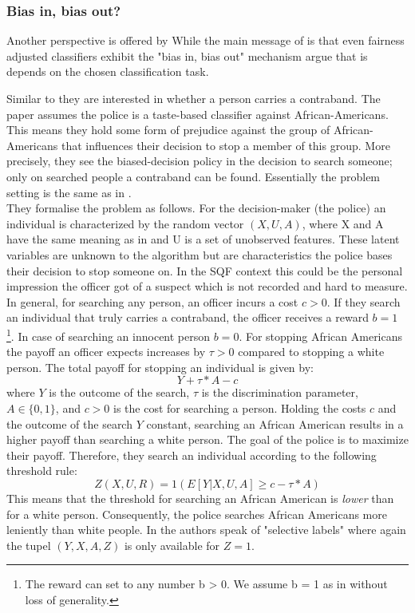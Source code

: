 \subsubsection*{Bias in, bias out?}

Another perspective is offered by \cite{RambachanBBOEFW}
While the main message of \cite{kallus2018} is that even fairness adjusted classifiers exhibit the "bias in, bias out" mechanism \cite{RambachanBBOEFW} argue that is depends on the chosen classification task.

Similar to \cite{kallus2018} they are interested in whether a person carries a contraband. The paper assumes the police is a taste-based classifier against African-Americans. This means they hold some form of prejudice against the group of African-Americans that influences their decision to stop a member of this group. More precisely, they see the biased-decision policy in the decision to search someone; only on searched people a contraband can be found. Essentially the problem setting is the same as in \cite{kallus2018}.\\

They formalise the problem as follows. For the decision-maker (the police) an individual is characterized by the random vector $(X, U, A)$, where X and A have the same meaning as in \cite{kallus2018}
and U is a set of unobserved features. These latent variables are unknown to the algorithm but are characteristics the police bases their decision to stop someone on. In the SQF context this could be the personal impression the officer got of a suspect which is not recorded and hard to measure.
In general, for searching any person, an officer incurs a cost $c > 0$. If they search an individual that truly carries a contraband, the officer receives a reward $b = 1$ \footnote{The reward can set to any number b > 0. We assume b = 1 as in \cite{RambachanBBOEFW} without loss of generality.}. In case of searching an innocent person $b = 0$.
For stopping African Americans the payoff an officer expects increases by $\tau > 0$ compared to stopping a white person. The total payoff for stopping an individual is given by:
$$Y + \tau * A - c$$
where $Y$ is the outcome of the search, $\tau$ is the discrimination parameter, $A \in \{0,1\}$, and $c > 0$ is the cost for searching a person.
Holding the costs $c$ and the outcome of the search $Y$ constant, searching an African American results in a higher payoff than searching a white person. The goal of the police is to maximize their payoff. Therefore, they search an individual according to the following threshold rule:
$$Z(X, U, R) = 1(E[Y|X, U, A] \ge c - \tau * A)$$
This means that the threshold for searching an African American is \textit{lower} than for a white person. Consequently, the police searches African Americans more leniently than white people.
In \cite{RambachanBBOEFW} the authors speak of "selective labels" where again the tupel $(Y, X, A, Z)$ is only available for $Z = 1$. \\



